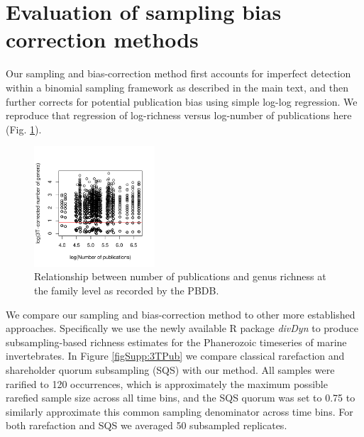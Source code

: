 \documentclass[12pt]{article}
\let\citep=\cite
\begin{document}
\section{Evaluation of sampling bias correction methods}
\label{sec:suppBiasEval}

Our sampling and bias-correction method first accounts for imperfect
detection within a binomial sampling framework as described in the
main text, and then further corrects for potential publication bias
using simple log-log regression.  We reproduce that regression of
log-richness versus log-number of publications here
(Fig. \ref{figSupp:divByPub}). 

\begin{figure}[!hp]
  \centering
  \includegraphics[width=0.4\textwidth]{../../figSupp_divByPub.pdf}
  \caption{Relationship between number of publications and genus
    richness at the family level as recorded by the PBDB.}
  \label{figSupp:divByPub}
\end{figure}


We compare our sampling and bias-correction method to other more
established approaches. Specifically we use the newly available R
package {\it divDyn} \citep{kocsis2018} to produce subsampling-based
richness estimates for the Phanerozoic timeseries of marine
invertebrates. In Figure \ref{figSupp:3TPub} we compare classical
rarefaction and shareholder quorum subsampling (SQS) with our
method. All samples were rarified to 120 occurrences, which is
approximately the maximum possible rarefied sample size across all
time bins, and the SQS quorum was set to 0.75 to similarly approximate
this common sampling denominator across time bins. For both
rarefaction and SQS we averaged 50 subsampled replicates.
\end{document}
